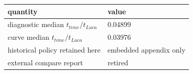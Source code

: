 \begin{tabular}{ll}
\toprule
quantity & value \\
\midrule
diagnostic median $t_{time}/t_{Luca}$ & 0.04899 \\
curve median $t_{time}/t_{Luca}$ & 0.03976 \\
historical policy retained here & embedded appendix only \\
external compare report & retired \\
\bottomrule
\end{tabular}
